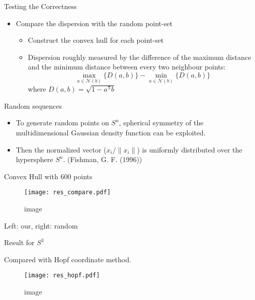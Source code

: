 \documentclass[10pt,ignorenonframetext,serif,onlymath]{beamer}
\begin{document}
\begin{frame}{Testing the Correctness}
\protect\hypertarget{testing-the-correctness}{}

\begin{itemize}
\item
  Compare the dispersion with the random point-set

  \begin{itemize}
  \item
    Construct the convex hull for each point-set
  \item
    Dispersion roughly measured by the difference of the maximum
    distance and the minimum distance between every two neighbour
    points: \[\max_{a \in \mathcal{N}(b)} \{D(a,b)\} -
            \min_{a \in \mathcal{N}(b)} \{ D(a, b) \}\] where
    \(D(a,b) = \sqrt{1 - a^\mathsf{T} b}\)
  \end{itemize}
\end{itemize}

\end{frame}

\begin{frame}{Random sequences}
\protect\hypertarget{random-sequences}{}

\begin{itemize}
\item
  To generate random points on \(S^n\), spherical symmetry of the
  multidimensional Gaussian density function can be exploited.
\item
  Then the normalized vector (\(x_i/\|x_i\|\)) is uniformly distributed
  over the hypersphere \(S^n\). (Fishman, G. F. (1996))
\end{itemize}

\end{frame}

\begin{frame}{Convex Hull with \(600\) points}
\protect\hypertarget{convex-hull-with-600-points}{}

\begin{figure}
\centering
\texttt{[image: res\_compare.pdf]}
\caption{image}
\end{figure}

Left: our, right: random

\end{frame}

\begin{frame}{Result for \(S^3\)}
\protect\hypertarget{result-for-s3}{}

Compared with Hopf coordinate method.

\begin{figure}
\centering
\texttt{[image: res\_hopf.pdf]}
\caption{image}
\end{figure}

\end{frame}
\end{document}
